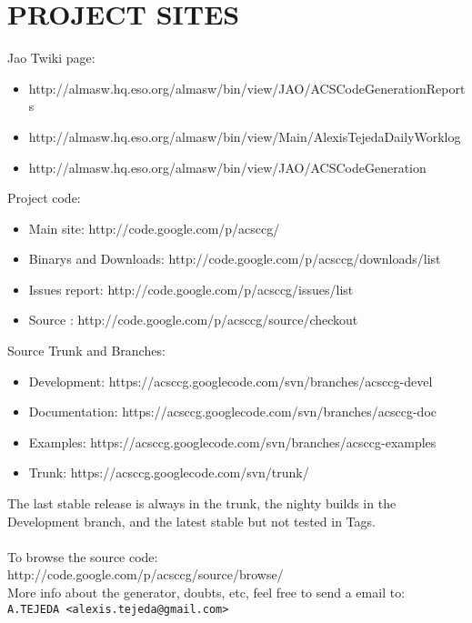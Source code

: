 \newpage
\section{PROJECT SITES}

Jao Twiki page:
\begin{itemize}
	\item http://almasw.hq.eso.org/almasw/bin/view/JAO/ACSCodeGenerationReports
	\item http://almasw.hq.eso.org/almasw/bin/view/Main/AlexisTejedaDailyWorklog
	\item http://almasw.hq.eso.org/almasw/bin/view/JAO/ACSCodeGeneration
\end{itemize}

Project code:
\begin{itemize}
	\item Main site: http://code.google.com/p/acsccg/
	\item Binarys and Downloads: http://code.google.com/p/acsccg/downloads/list
	\item Issues report: http://code.google.com/p/acsccg/issues/list
	\item Source : http://code.google.com/p/acsccg/source/checkout
\end{itemize}
 
 Source Trunk and Branches:
 \begin{itemize}
	\item Development: https://acsccg.googlecode.com/svn/branches/acsccg-devel
	\item Documentation: https://acsccg.googlecode.com/svn/branches/acsccg-doc
	\item Examples:  https://acsccg.googlecode.com/svn/branches/acsccg-examples
	\item Trunk: https://acsccg.googlecode.com/svn/trunk/
\end{itemize}

The last stable release is always in the trunk, the nighty builds in the
Development branch, and the latest stable but not tested in Tags.\\
\\To browse the source code:
\\
http://code.google.com/p/acsccg/source/browse/
\\

More info about the generator, doubts, etc, feel free to send a email to:\\
\verb+A.TEJEDA <alexis.tejeda@gmail.com>+
